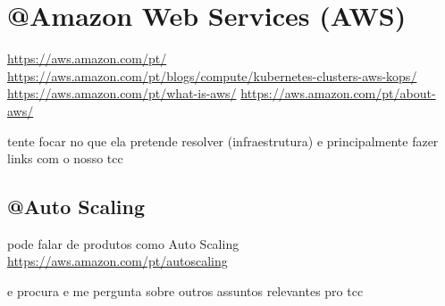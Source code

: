 \chapter{@Amazon Web Services (AWS)}

\url{https://aws.amazon.com/pt/}
\url{https://aws.amazon.com/pt/blogs/compute/kubernetes-clusters-aws-kops/}
\url{https://aws.amazon.com/pt/what-is-aws/}
\url{https://aws.amazon.com/pt/about-aws/}

tente focar no que ela pretende resolver (infraestrutura) e principalmente
fazer links com o nosso tcc

\section{@Auto Scaling}
pode falar de produtos como Auto Scaling
\url{https://aws.amazon.com/pt/autoscaling}

e procura e me pergunta sobre outros assuntos relevantes pro tcc
